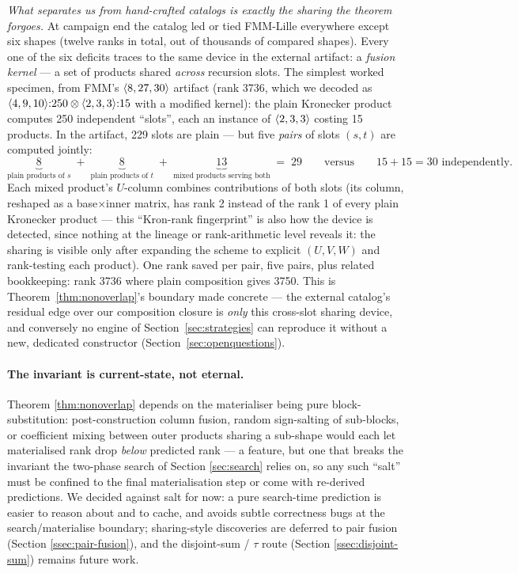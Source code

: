 \emph{What separates us from hand-crafted catalogs is exactly the
sharing the theorem forgoes.} At campaign end the catalog led or tied
FMM-Lille everywhere except six shapes (twelve ranks in total, out of
thousands of compared shapes). Every one of the six deficits traces to
the same device in the external artifact: a \emph{fusion kernel} ---
a set of products shared \emph{across} recursion slots. The simplest
worked specimen, from FMM's \(\langle 8, 27, 30 \rangle\) artifact
(rank 3736, which we decoded as
\(\langle 4, 9, 10 \rangle{:}250 \otimes \langle 2, 3, 3 \rangle{:}15\) with a
modified kernel): the plain Kronecker product computes 250 independent
``slots'', each an instance of \(\langle 2, 3, 3 \rangle\) costing 15
products. In the artifact, 229 slots are plain --- but five
\emph{pairs} of slots \((s,t)\) are computed jointly:
\[
  \underbrace{8}_{\text{plain products of } s}
  \;+\; \underbrace{8}_{\text{plain products of } t}
  \;+\; \underbrace{13}_{\text{mixed products serving both}}
  \;=\; 29
  \qquad\text{versus}\qquad
  15 + 15 = 30 \text{ independently.}
\]
Each mixed product's \(U\)-column combines contributions of both
slots (its column, reshaped as a base\(\times\)inner matrix, has rank
2 instead of the rank 1 of every plain Kronecker product --- this
``Kron-rank fingerprint'' is also how the device is detected, since
nothing at the lineage or rank-arithmetic level reveals it: the
sharing is visible only after expanding the scheme to explicit
\((U,V,W)\) and rank-testing each product). One rank saved per pair,
five pairs, plus related bookkeeping: rank 3736 where plain
composition gives 3750. This is Theorem~\ref{thm:nonoverlap}'s
boundary made concrete --- the external catalog's residual edge over
our composition closure is \emph{only} this cross-slot sharing device,
and conversely no engine of Section~\ref{sec:strategies} can reproduce
it without a new, dedicated constructor
(Section~\ref{sec:openquestions}).

\paragraph{The invariant is current-state, not eternal.}
Theorem \ref{thm:nonoverlap} depends on the materialiser being pure
block-substitution: post-construction column fusion, random sign-salting
of sub-blocks, or coefficient mixing between outer products sharing a
sub-shape would each let materialised rank drop \emph{below} predicted
rank --- a feature, but one that breaks the invariant the two-phase
search of Section \ref{sec:search} relies on, so any such ``salt'' must
be confined to the final materialisation step or come with re-derived
predictions. We decided against salt for now: a pure search-time
prediction is easier to reason about and to cache, and avoids subtle
correctness bugs at the search/materialise boundary; sharing-style
discoveries are deferred to pair fusion (Section \ref{ssec:pair-fusion}),
and the disjoint-sum / $\tau$ route (Section \ref{ssec:disjoint-sum})
remains future work.
